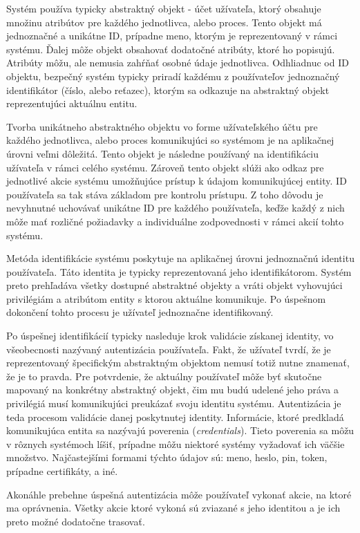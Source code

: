 \documentclass[
  digital, %
  table,   %
  lof,     %
  nolot,   %
  nocover
]{fithesis3}
\begin{document}
Systém používa typicky
abstraktný objekt - účet užívateľa, ktorý obsahuje množinu atribútov pre
každého jednotlivca, alebo proces. Tento objekt má jednoznačné a unikátne
ID, prípadne meno, ktorým je reprezentovaný v rámci systému. Ďalej môže objekt
obsahovať dodatočné atribúty, ktoré ho popisujú. Atribúty môžu, ale nemusia
zahŕňať osobné údaje jednotlivca. Odhliadnuc od ID objektu, bezpečný systém
typicky priradí každému z používateľov jednoznačný identifikátor (číslo, alebo
reťazec), ktorým sa odkazuje na abstraktný objekt reprezentujúci aktuálnu
entitu. 

Tvorba unikátneho abstraktného objektu vo forme užívateľského účtu
pre každého jednotlivca, alebo proces komunikujúci so systémom je na aplikačnej
úrovni veľmi dôležitá. Tento objekt je následne používaný na identifikáciu
užívateľa v rámci celého systému. Zároveň tento objekt slúži ako odkaz pre
jednotlivé akcie systému umožňujúce prístup k údajom komunikujúcej entity.
ID používateľa sa tak stáva základom pre kontrolu prístupu. Z toho dôvodu je 
nevyhnutné uchovávať unikátne ID pre každého používateľa, keďže každý z nich
môže mať rozličné požiadavky a individuálne zodpovednosti v rámci akcií tohto
systému.

Metóda identifikácie systému poskytuje na aplikačnej úrovni jednoznačnú
identitu používateľa. Táto identita je typicky reprezentovaná jeho
identifikátorom. Systém preto prehľadáva všetky dostupné abstraktné objekty a
vráti objekt vyhovujúci privilégiám a atribútom entity s ktorou aktuálne
komunikuje. Po úspešnom dokončení tohto procesu je užívateľ jednoznačne
identifikovaný.

Po úspešnej identifikácií typicky nasleduje krok validácie získanej identity,
vo všeobecnosti nazývaný autentizácia používateľa. Fakt, že užívateľ tvrdí,
že je reprezentovaný špecifickým abstraktným objektom nemusí totiž nutne
znamenať, že je to pravda. Pre potvrdenie, že aktuálny používateľ môže byť
skutočne mapovaný na konkrétny abstraktný objekt, čim mu budú udelené jeho
práva a privilégiá musí komunikujúci preukázať svoju identitu systému.
Autentizácia je teda procesom validácie danej poskytnutej identity. Informácie,
ktoré predkladá komunikujúca entita sa nazývajú poverenia
(\textit{credentials}). Tieto poverenia sa môžu v rôznych systémoch líšiť, 
prípadne môžu niektoré systémy vyžadovať ich väčšie množstvo. Najčastejšími
formami týchto údajov sú: meno, heslo, pin, token, prípadne certifikáty, a iné.

Akonáhle prebehne úspešná autentizácia môže používateľ vykonať akcie, na ktoré
ma oprávnenia. Všetky akcie ktoré vykoná sú zviazané s jeho identitou a je ich
preto možné dodatočne trasovať.
\end{document}
